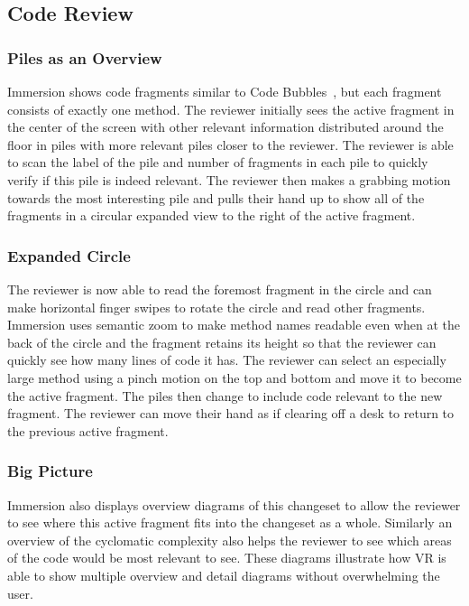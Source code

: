 \documentclass[conference]{IEEEtran}
\begin{document}
\subsection{Code Review}


\subsubsection{Piles as an Overview}
Immersion shows code fragments similar to Code Bubbles~\cite{Bragdon:CodeBubbles}, but each fragment consists of exactly one method.  
The reviewer initially sees the active fragment in the center of the screen with other relevant information distributed around the floor in piles with more relevant piles closer to the reviewer. 
The reviewer is able to scan the label of the pile and number of fragments in each pile to quickly verify if this pile is indeed relevant. 
The reviewer then makes a grabbing motion towards the most interesting pile and pulls their hand up to show all of the fragments in a circular expanded view to the right of the active fragment.

\subsubsection{Expanded Circle}
The reviewer is now able to read the foremost fragment in the circle and can make horizontal finger swipes to rotate the circle and read other fragments. 
Immersion uses semantic zoom to make method names readable even when at the back of the circle and the fragment retains its height so that the reviewer can quickly see how many lines of code it has. 
The reviewer can select an especially large method using a pinch motion on the top and bottom and move it to become the active fragment. 
The piles then change to include code relevant to the new fragment. 
The reviewer can move their hand as if clearing off a desk to return to the previous active fragment.

\subsubsection{Big Picture}
Immersion also displays overview diagrams of this changeset to allow the reviewer to see where this active fragment fits into the changeset as a whole. 
Similarly an overview of the cyclomatic complexity also helps the reviewer to see which areas of the code would be most relevant to see. 
These diagrams illustrate how VR is able to show multiple overview and detail diagrams without overwhelming the user.
\end{document}
